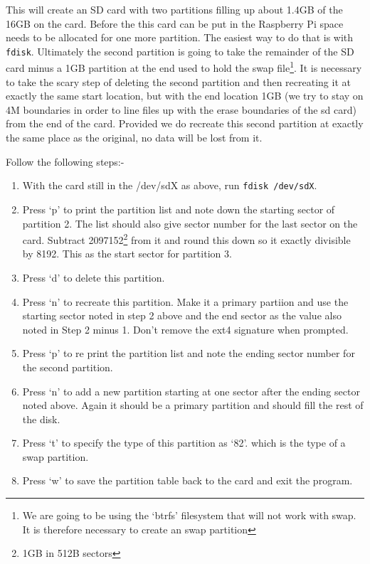 \documentclass[Draft]{akc}
\begin{document}
This will create an SD card with two partitions filling up about 1.4GB of the 16GB on the card.
Before the this card can be put in the Raspberry Pi space needs to be allocated for one more
partition.  The easiest way to do that is with  \texttt{fdisk}.  Ultimately the second partition is
going to take the remainder of the SD card minus a 1GB partition at the end used to hold the swap
file\footnote{We are going to be using the `btrfs' filesystem that will not work with swap. It is
therefore necessary to create an swap partition}.  It is necessary to
take the scary step of deleting the second partition and then recreating it at exactly the same
start location, but with the end location 1GB (we try to stay on 4M boundaries in order to line files up
with the erase boundaries of the sd card) from the end of the card. Provided we do recreate this
second partition at exactly the same place as the original, no data will be lost from it.

Follow the following steps:-
\begin{enumerate}
\item With the card still in the /dev/sdX as above, run \texttt{fdisk /dev/sdX}.
\item Press `p' to print the partition list and note down the starting sector of partition 2.  The
list should also give sector number for the last sector on the card. Subtract 2097152\footnote{1GB
in 512B sectors} from it and round this down so it exactly divisible by 8192. This as the start sector
for partition 3.
\item Press `d' to delete this partition.
\item Press `n' to recreate this partition.  Make it a primary partiion and use the starting sector
noted in step 2 above and the end sector as the value also noted in Step 2 minus 1. Don't remove the
ext4 signature when prompted.
\item Press `p' to re print the partition list and note the ending sector number for the second partition.
\item Press `n' to add a new partition starting at one sector after the ending sector noted above.
Again it should be a primary partition and should fill the rest of the disk.
\item Press `t' to specify the type of this partition as `82'. which is the type of a swap partition.
\item Press `w' to save the partition table back to the card and exit the program.
\end{enumerate}
\end{document}
